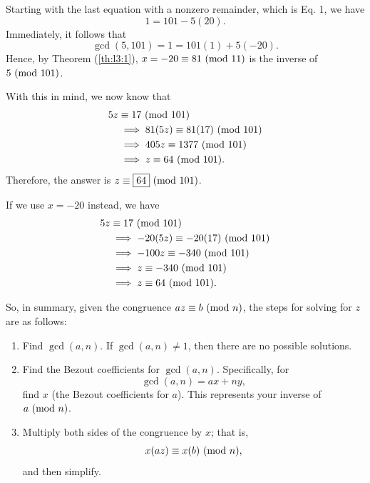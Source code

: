 \documentclass[letterpaper]{article}
\newcommand{\0}{\mathbf{0}}
\begin{document}
\begin{mdframed}
\begin{itemize}
\begin{mdframed}
            Starting with the last equation with a nonzero remainder, which is Eq. 1, we have 
            \[1 = 101 - 5(20).\]
            Immediately, it follows that 
            \[\gcd(5, 101) = 1 = 101(1) + 5(-20).\]
            Hence, by Theorem (\ref{th:l3:1}), $x = -20 \equiv 81 \ (\mathrm{mod}\ 11)$ is the inverse of $5 \ (\mathrm{mod}\ 101)$.

            \bigskip 

            With this in mind, we now know that 
            \begin{equation*}
                \begin{aligned}
                    5z &\equiv 17 \ (\mathrm{mod}\ 101) \\ 
                        &\implies 81(5z) \equiv 81(17) \ (\mathrm{mod}\ 101) \\ 
                        &\implies 405z \equiv 1377 \ (\mathrm{mod}\ 101) \\ 
                        &\implies z \equiv 64 \ (\mathrm{mod}\ 101).
                \end{aligned}
            \end{equation*}
            Therefore, the answer is $z \equiv \boxed{64} \ (\mathrm{mod}\ 101)$.

            \begin{mdframed}
                If we use $x = -20$ instead, we have 
                \begin{equation*}
                    \begin{aligned}
                        5z &\equiv 17 \ (\mathrm{mod}\ 101) \\ 
                            &\implies -20(5z) \equiv -20(17) \ (\mathrm{mod}\ 101) \\ 
                            &\implies -100z \equiv -340 \ (\mathrm{mod}\ 101) \\ 
                            &\implies z \equiv -340 \ (\mathrm{mod}\ 101) \\ 
                            &\implies z \equiv 64 \ (\mathrm{mod}\ 101).
                    \end{aligned}
                \end{equation*}
            \end{mdframed}
        \end{mdframed}
    \end{itemize}
\end{mdframed}
So, in summary, given the congruence $az \equiv b \ (\mathrm{mod}\ n)$, the steps for solving for $z$ are as follows: 
\begin{enumerate}
    \item Find $\gcd(a, n)$. If $\gcd(a, n) \neq 1$, then there are no possible solutions.
    \item Find the Bezout coefficients for $\gcd(a, n)$. Specifically, for \[\gcd(a, n) = ax + ny,\] find $x$ (the Bezout coefficients for $a$). This represents your inverse of $a \ (\mathrm{mod}\ n)$.
    \item Multiply both sides of the congruence by $x$; that is, 
    \[x(az) \equiv x(b) \ (\mathrm{mod}\ n),\]
    and then simplify.
\end{enumerate}
\end{document}
